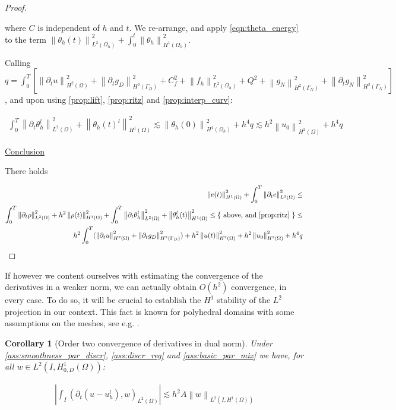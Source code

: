 \documentclass[english,a4paper,9pt,oneside]{scrbook}	%
\theoremstyle{break}
\newtheorem{cor}[equation]{Corollary}
\newenvironment{mproof}[1][\proofname]{%
  \begin{proof}[#1]$ $\par\nobreak\ignorespaces
}{%
  \end{proof}
}
\renewcommand*{\proofname}{Proof}
\theoremstyle{remark}
\newcommand{\ds}{\displaystyle}
\newcommand{\norm}[1]{\left\lVert#1\right\rVert}
\newcommand{\ind}[1]{\{\text{ #1 }\}}
\begin{document}
\begin{appendices}
\begin{mproof}
where $C$ is independent of $h$ and $t$. We re-arrange, and apply \cref{eqn:theta_energy} to the term $\ds \norm{ \theta_h(t)}^2_{L^2(\Omega_h)} + \int_0^t \norm{ \theta_h}_{H^1(\Omega_h)}^2$. 

Calling $q=\ds \int_0^T \left [ \norm{\partial_t u}_{H^2(\Omega)}^2 +	\norm{\partial_t g_D}_{H^2(\Gamma_D)}^2 + C_f^2 +  \norm{f_h}_{L^2(\Omega_h)}^2 + Q^2+ \norm{g_N}_{H^2(\Gamma_N)}^2 + \norm{\partial_t g_N}_{H^2(\Gamma_N)}^2 \right ] $, and upon using \cref{prop:lift}, \cref{prop:ritz} and \cref{prop:interp_curv}:

\begin{align*}
\int_0^T\norm{\partial_t \theta_h^l}^2_{L^2(\Omega)} + \norm{\theta_h(t)^l}_{H^1(\Omega)}^2 \lesssim  \norm{\theta_h(0)}_{H^1(\Omega_h)}^2+ h^4q \lesssim h^2\norm{u_0}_{H^2(\Omega)}^2+ h^4q
\end{align*}

\underline{Conclusion}

There holds 

\begin{align*}
\norm{e(t)}_{H^1(\Omega)}^2 + \int_0^T\norm{\partial_t e}^2_{L^2(\Omega)}  \leq \\
\int_0^T\norm{\partial_t \rho}^2_{L^2(\Omega)} + h^2\norm{\rho(t)}_{H^1(\Omega)}^2 + \int_0^T\norm{\partial_t  \theta_h^l}^2_{L^2(\Omega)} + \norm{ \theta_h^l(t)}_{H^1(\Omega)}^2\leq \ind{above, and \cref{prop:ritz}}\leq \\
h^2\int_0^T(\norm{\partial_t u }_{H^2(\Omega)}^2 + \norm{\partial_t g_D }_{H^2(\Gamma_D)}^2) + h^2\norm{u(t)}_{H^2(\Omega)}^2 +  h^2\norm{u_0}_{H^2(\Omega)}^2+ h^4q
\end{align*}
\end{mproof}

If however we content ourselves with estimating the convergence of the derivatives in a weaker norm, we can actually obtain $O(h^2)$ convergence, in every case. To do so, it will be crucial to establish the $H^1$ stability of the $L^2$ projection in our context. This fact is known for polyhedral domains with some assumptions on the meshes, see e.g. \cite{yserentant}.

\begin{cor}[Order two convergence of derivatives in dual norm]
\label{cor:deriv_est_semid}
Under \cref{ass:smoothness_par_discr}, \cref{ass:discr_reg} and \cref{ass:basic_par_mix} we have, for all $w \in L^2(I,H^1_{0,D}(\Omega))$:

\begin{align*}
\left | \int_I (\partial_t(u-u_h^l), w)_{L^2(\Omega)}\right |\lesssim h^2 A \norm{w}_{L^2(I,H^1(\Omega))}
\end{align*}


\end{cor}
\end{appendices}
\end{document}
